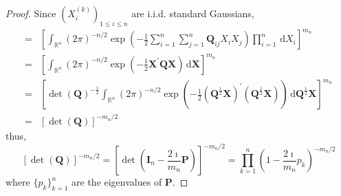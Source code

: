 \begin{proof}
    Since $\left(X_{i}^{(k)}\right)_{1\leq i\leq n}$ are i.i.d. standard Gaussians,
    \begin{equation*}
        \begin{aligned}
            = & \left[\int_{\mathbb{R}^{n}}(2\pi)^{-n/2}\exp\left(-\frac{1}{2}\sum_{i=1}^{n}\sum_{j=1}^{n}\mathbf{Q}_{ij}X_{i}X_{j}\right)\prod_{i=1}^{n}\,\mathrm{d}X_{i}\right]^{m_{n}}                                                                                                                         \\
            = & \left[\int_{\mathbb{R}^{n}}(2\pi)^{-n/2}\exp\left(-\frac{1}{2}\mathbf{X}^{\prime}\mathbf{Q}\mathbf{X}\right)\,\mathrm{d}\mathbf{X}\right]^{m_{n}}                                                                                                                                                 \\
            = & \left[\operatorname{det}\left(\mathbf{Q}\right)^{-\frac{1}{2}}\int_{\mathbb{R}^{n}}(2\pi)^{-n/2}\exp\left(-\frac{1}{2}\left(\mathbf{Q}^{\frac{1}{2}}\mathbf{X}\right)^{\prime}\left(\mathbf{Q}^{\frac{1}{2}}\mathbf{X}\right)\right)\,\mathrm{d}\mathbf{Q}^{\frac{1}{2}}\mathbf{X}\right]^{m_{n}} \\
            = & \left[\operatorname{det}\left(\mathbf{Q}\right)\right]^{-m_{n}/2}
        \end{aligned}
    \end{equation*}
    thus,
    \begin{equation}
        \left[\operatorname{det}\left(\mathbf{Q}\right)\right]^{-m_{n}/2}=\left[\operatorname{det}\left(\mathbf{I}_{n}-\frac{2\imath}{m_{n}}\mathbf{P}\right)\right]^{-m_{n}/2}=\prod_{k=1}^{n}\left(1-\frac{2\imath}{m_n}p_{k}\right)^{-m_{n}/2}
        \label{eq:characteristic-function-wishart-result-1}
    \end{equation}
    where $\{p_{k}\}_{k=1}^{n}$ are the eigenvalues of $\mathbf{P}$.


\end{proof}
